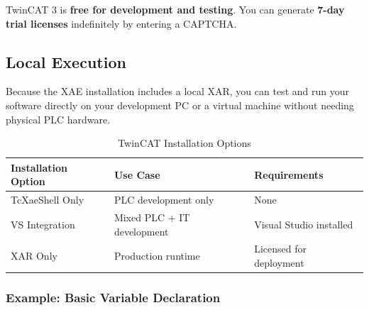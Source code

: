\documentclass[11pt,a4paper]{article}
\begin{document}
TwinCAT 3 is \textbf{free for development and testing}. You can generate \textbf{7-day trial licenses} indefinitely by entering a CAPTCHA.

\subsection{Local Execution}

Because the XAE installation includes a local XAR, you can test and run your software directly on your development PC or a virtual machine without needing physical PLC hardware.

\begin{table}[h]
\centering
\begin{tabular}{@{}lll@{}}
\toprule
\textbf{Installation Option} & \textbf{Use Case} & \textbf{Requirements} \\
\midrule
TcXaeShell Only & PLC development only & None \\
VS Integration & Mixed PLC + IT development & Visual Studio installed \\
XAR Only & Production runtime & Licensed for deployment \\
\bottomrule
\end{tabular}
\caption{TwinCAT Installation Options}
\end{table}

\subsubsection*{Example: Basic Variable Declaration}
\end{document}
